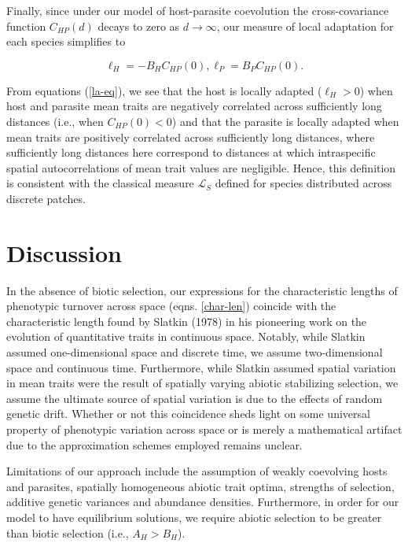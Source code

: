 \documentclass{article}
\begin{document}
Finally, since under our model of host-parasite coevolution the
cross-covariance function \(C_{HP}(d)\) decays to zero as
\(d\to\infty\), our measure of local adaptation for each species
simplifies to

\begin{subequations}\label{la-eq}
  \begin{equation}
    \ell_H = -B_HC_{HP}(0),
  \end{equation}
  \begin{equation}
    \ell_P = B_PC_{HP}(0).
  \end{equation}
\end{subequations}

From equations (\ref{la-eq}), we see that the host is locally adapted
(\(\ell_H>0\)) when host and parasite mean traits are negatively
correlated across sufficiently long distances (i.e., when
\(C_{HP}(0)<0\)) and that the parasite is locally adapted when mean
traits are positively correlated across sufficiently long distances,
where sufficiently long distances here correspond to distances at which
intraspecific spatial autocorrelations of mean trait values are
negligible. Hence, this definition is consistent with the classical
measure \(\mathcal L_S\) defined for species distributed across discrete
patches.

\hypertarget{discussion}{%
\section{Discussion}\label{discussion}}

In the absence of biotic selection, our expressions for the
characteristic lengths of phenotypic turnover across space (eqns.
\ref{char-len}) coincide with the characteristic length found by Slatkin
(1978) in his pioneering work on the evolution of quantitative traits in
continuous space. Notably, while Slatkin assumed one-dimensional space
and discrete time, we assume two-dimensional space and continuous time.
Furthermore, while Slatkin assumed spatial variation in mean traits were
the result of spatially varying abiotic stabilizing selection, we assume
the ultimate source of spatial variation is due to the effects of random
genetic drift. Whether or not this coincidence sheds light on some
universal property of phenotypic variation across space or is merely a
mathematical artifact due to the approximation schemes employed remains
unclear.

Limitations of our approach include the assumption of weakly coevolving
hosts and parasites, spatially homogeneous abiotic trait optima,
strengths of selection, additive genetic variances and abundance
densities. Furthermore, in order for our model to have equilibrium
solutions, we require abiotic selection to be greater than biotic
selection (i.e., \(A_H>B_H\)).
\end{document}
